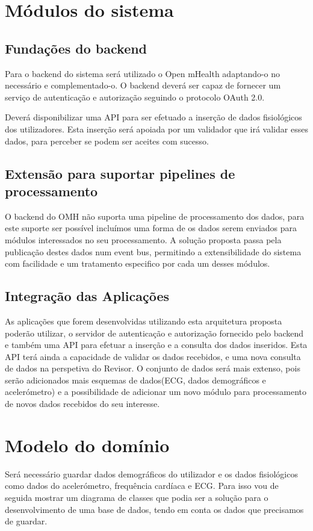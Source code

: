 \section{Módulos do sistema}
\subsection{Fundações do backend}
Para o backend do sistema será utilizado o Open mHealth adaptando-o no necessário e complementado-o. O backend deverá ser capaz de fornecer um serviço de autenticação e autorização seguindo o protocolo OAuth 2.0. \par 
Deverá disponibilizar uma \gls{API} para ser efetuado a inserção de dados fisiológicos dos utilizadores. Esta inserção será apoiada por um validador que irá validar esses dados, para perceber se podem ser aceites com sucesso.


\subsection{Extensão para suportar pipelines de processamento}
O backend do \gls{OMH} não suporta uma pipeline de processamento dos dados, para este suporte ser possível incluímos uma forma de os dados serem enviados para módulos interessados no seu processamento. A solução proposta passa pela publicação destes dados num event bus, permitindo a extensibilidade do sistema com facilidade e um tratamento especifico por cada um desses módulos.


\subsection{Integração das Aplicações}
As aplicações que forem desenvolvidas utilizando esta arquitetura proposta poderão utilizar, o servidor de autenticação e autorização fornecido pelo backend e também uma \gls{API} para efetuar a inserção e a consulta dos dados inseridos. Esta \gls{API} terá ainda a capacidade de validar os dados recebidos, e uma nova consulta de dados na perspetiva do Revisor. O conjunto de dados será mais extenso, pois serão adicionados mais esquemas de dados(\gls{ECG}, dados demográficos e acelerómetro) e a possibilidade de adicionar um novo módulo para processamento de novos dados recebidos do seu interesse.





\section{Modelo do domínio}
Será necessário guardar dados demográficos do utilizador e os dados fisiológicos como dados do acelerómetro, frequência cardíaca e \gls{ECG}. Para isso vou de seguida mostrar um diagrama de classes que podia ser a solução para o desenvolvimento de uma base de dados, tendo em conta os dados que precisamos de guardar.

